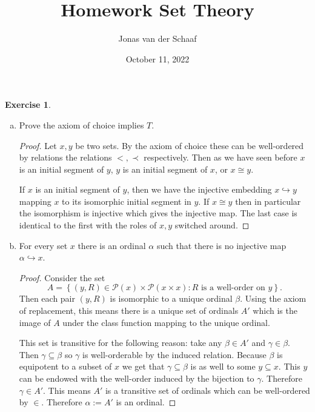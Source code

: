 \documentclass{article}
\title{Homework Set Theory}
\date{October 11, 2022}
\author{Jonas van der Schaaf}
\theoremstyle{definition}
\newtheorem{question}{Exercise}
\newcommand{\set}[1]{\left\{#1\right\}}
\newcommand{\setwith}[2]{\set{#1\colon#2}}
\newcommand{\powset}{\mathcal{P}}
\begin{document}
\maketitle

\begin{question}
    \begin{enumerate}[a.]
        \item Prove the axiom of choice implies \(T\).

              \begin{proof}
                  Let \(x,y\) be two sets. By the axiom of choice these can be
                  well-ordered by relations the relations \(<,\prec\)
                  respectively. Then as we have seen before \(x\) is an initial
                  segment of \(y\), \(y\) is an initial segment of \(x\), or
                  \(x\cong y\).

                  If \(x\) is an initial segment of \(y\), then we have the
                  injective embedding \(x\hookrightarrow y\) mapping \(x\) to
                  its isomorphic initial segment in \(y\). If \(x\cong y\) then
                  in particular the isomorphism is injective which gives the
                  injective map. The last case is identical to the first with
                  the roles of \(x,y\) switched around.
              \end{proof}

        \item For every set \(x\) there is an ordinal \(\alpha\) such that there
              is no injective map \(\alpha\hookrightarrow x\).

              \begin{proof}
                  Consider the set
                  \[
                      A=\setwith{(y,R)\in\powset(x)\times\powset(x\times x)}{\text{\(R\) is a well-order on \(y\)}}.
                  \]
                  Then each pair \((y,R)\) is isomorphic to a unique ordinal
                  \(\beta\). Using the axiom of replacement, this means there is
                  a unique set of ordinals \(A'\) which is the image of \(A\)
                  under the class function mapping to the unique ordinal.

                  This set is transitive for the following reason: take any
                  \(\beta\in A'\) and \(\gamma\in\beta\). Then
                  \(\gamma\subseteq\beta\) so \(\gamma\) is well-orderable by
                  the induced relation. Because \(\beta\) is equipotent to a
                  subset of \(x\) we get that \(\gamma\subseteq\beta\) is as
                  well to some \(y\subseteq x\). This \(y\) can be endowed with
                  the well-order induced by the bijection to \(\gamma\).
                  Therefore \(\gamma\in A'\). This means \(A'\) is a transitive
                  set of ordinals which can be well-ordered by \(\in\).
                  Therefore \(\alpha:=A'\) is an ordinal.



\end{proof}
\end{enumerate}
\end{question}
\end{document}
